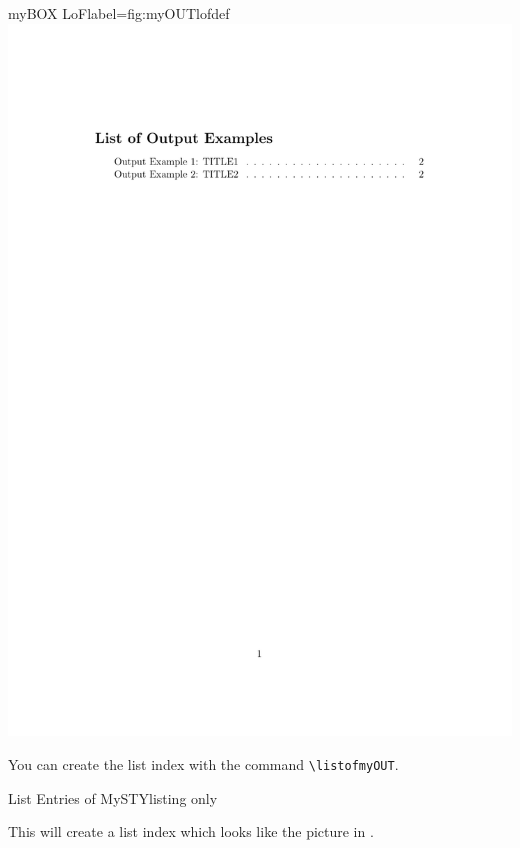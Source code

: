 \documentclass[]{myHOWTO-V001}
\begin{document}
\begin{minipage}{0.46\linewidth}
\centering
\begin{myFIGlst}{myBOX LoF}{label={fig:myOUTlofdef}}
	\includegraphics[page=1,scale=0.18]{examples/myOUTV000.pdf}
\end{myFIGlst}
\end{minipage}
\begin{minipage}{0.46\linewidth}
You can create the list index with the command \Verb|\listofmyOUT|.

\begin{myTEXEXdoclst}{List Entries of MySTY}{listing only}
\listofmyOUT
\end{myTEXEXdoclst}

This will create a list index which looks like the picture in . 
\end{minipage}
\end{document}
